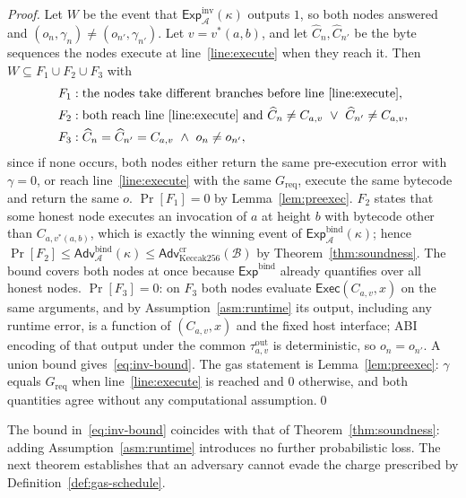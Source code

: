 \documentclass[runningheads]{llncs}
\begin{document}
\begin{proof}
Let $W$ be the event that $\mathsf{Exp}^{\mathrm{inv}}_{\mathcal{A}}(\kappa)$ outputs $1$, so both nodes answered and $(o_n,\gamma_n)\neq(o_{n'},\gamma_{n'})$. Let $v=v^{*}(a,b)$, and let $\widehat{C}_n,\widehat{C}_{n'}$ be the byte sequences the nodes execute at line~\ref{line:execute} when they reach it. Then $W\subseteq F_1\cup F_2\cup F_3$ with
\begin{align*}
F_1 &: \text{the nodes take different branches before line~\ref{line:execute}},\\
F_2 &: \text{both reach line~\ref{line:execute} and } \widehat{C}_n\neq C_{a,v}\ \vee\ \widehat{C}_{n'}\neq C_{a,v},\\
F_3 &: \widehat{C}_n=\widehat{C}_{n'}=C_{a,v}\ \wedge\ o_n\neq o_{n'},
\end{align*}
since if none occurs, both nodes either return the same pre-execution error with $\gamma=0$, or reach line~\ref{line:execute} with the same $G_{\mathrm{req}}$, execute the same bytecode and return the same $o$.
$\Pr[F_1]=0$ by Lemma~\ref{lem:preexec}.
$F_2$ states that some honest node executes an invocation of $a$ at height $b$ with bytecode other than $C_{a,v^{*}(a,b)}$, which is exactly the winning event of $\mathsf{Exp}^{\mathrm{bind}}_{\mathcal{A}}(\kappa)$; hence $\Pr[F_2]\le\mathsf{Adv}^{\mathrm{bind}}_{\mathcal{A}}(\kappa)\le\mathsf{Adv}^{\mathrm{cr}}_{\mathrm{Keccak256}}(\mathcal{B})$ by Theorem~\ref{thm:soundness}. The bound covers both nodes at once because $\mathsf{Exp}^{\mathrm{bind}}$ already quantifies over all honest nodes.
$\Pr[F_3]=0$: on $F_3$ both nodes evaluate $\mathsf{Exec}(C_{a,v},x)$ on the same arguments, and by Assumption~\ref{asm:runtime} its output, including any runtime error, is a function of $(C_{a,v},x)$ and the fixed host interface; ABI encoding of that output under the common $\tau^{\mathrm{out}}_{a,v}$ is deterministic, so $o_n=o_{n'}$.
A union bound gives~\eqref{eq:inv-bound}. The gas statement is Lemma~\ref{lem:preexec}: $\gamma$ equals $G_{\mathrm{req}}$ when line~\ref{line:execute} is reached and $0$ otherwise, and both quantities agree without any computational assumption.\qed
\end{proof}

The bound in~\eqref{eq:inv-bound} coincides with that of Theorem~\ref{thm:soundness}: adding Assumption~\ref{asm:runtime} introduces no further probabilistic loss. The next theorem establishes that an adversary cannot evade the charge prescribed by Definition~\ref{def:gas-schedule}.
\end{document}
